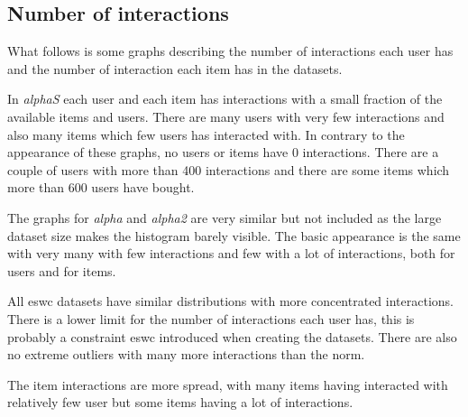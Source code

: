 
\subsection{Number of interactions}\label{sec:result:interactions}


What follows is some graphs describing the number of interactions each user has and the number of interaction each item has in the datasets.

\FloatBarrier


In \textit{alphaS} each user and each item has interactions with a small fraction of the available items and users. There are many users with very few interactions and also many items which few users has interacted with. In contrary to the appearance of these graphs, no users or items have 0 interactions. There are a couple of users with more than 400 interactions and there are some items which more than 600 users have bought.

The graphs for \textit{alpha} and \textit{alpha2} are very similar but not included as the large dataset size makes the histogram barely visible. The basic appearance is the same with very many with few interactions and few with a lot of interactions, both for users and for items.

\newpage




\FloatBarrier

All eswc datasets have similar distributions with more concentrated interactions. There is a lower limit for the number of interactions each user has, this is probably a constraint eswc introduced when creating the datasets. There are also no extreme outliers with many more interactions than the norm.

The item interactions are more spread, with many items having interacted with relatively few user but some items having a lot of interactions.

\newpage

